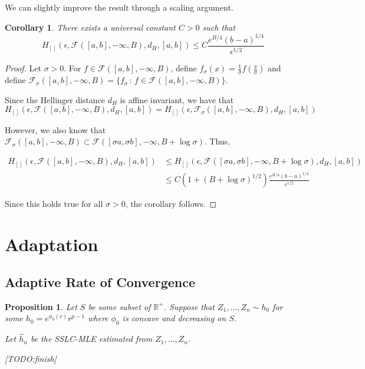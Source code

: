 \documentclass[12pt]{article}
\newtheorem{proposition}[theorem]{Proposition}
\newtheorem{corollary}[theorem]{Corollary}
\begin{document}
We can slightly improve the result through a scaling argument.

\begin{corollary}
  \label{Cor:SegmentBracket}
There exists a universal constant $C > 0$ such that 
\[
H_{[]}( \epsilon, \mathcal{F}([a,b],-\infty, B), d_H, [a,b]) \leq C \frac{ e^{B/4} (b-a)^{1/4}}{\epsilon^{1/2}} 
\]
\end{corollary}

\begin{proof}

Let $\sigma > 0$. For $f \in \mathcal{F}([a,b], -\infty, B)$, define $f_{\sigma}(x) = \frac{1}{\sigma} f( \frac{x}{\sigma})$ and define $\mathcal{F}_\sigma([a,b], - \infty, B) = \{ f_{\sigma} \,:\, f \in \mathcal{F}([a,b], - \infty, B) \}$. 

Since the Hellinger distance $d_H$ is affine invariant, we have that 
\[
H_{[]}( \epsilon, \mathcal{F}([a,b],-\infty, B), d_H, [a,b]) = H_{[]}( \epsilon, \mathcal{F}_\sigma([a,b],-\infty, B), d_H, [a,b])
\]

However, we also know that  $\mathcal{F}_\sigma([a,b],-\infty, B) \subset \mathcal{F}([\sigma a, \sigma b], -\infty, B + \log \sigma)$. Thus,

\begin{align*}
H_{[]}( \epsilon, \mathcal{F}([a,b],-\infty, B), d_H, [a,b]) &\leq H_{[]}( \epsilon, \mathcal{F}([\sigma a, \sigma b],-\infty, B + \log \sigma), d_H, [a,b])\\
  &\leq C( 1 + (B + \log \sigma)^{1/2}) \frac{ e^{B/4} (b-a)^{1/4}}{\epsilon^{1/2}} 
\end{align*}

Since this holds true for all $\sigma  > 0$, the corollary follows. 

\end{proof}

\newpage
\section{Adaptation}

\subsection{Adaptive Rate of Convergence}


\begin{proposition}
  Let $S$ be some subset of $\mathbb{R}^+$. 
  Suppose that $Z_1,...,Z_n \sim h_0$ for some $h_0 = e^{\phi_0(r)} r^{p-1}$ where $\phi_0$ is concave and decreasing on $S$.

  Let $\hat{h}_n$ be the SSLC-MLE estimated from $Z_1,...,Z_n$.

  [TODO:finish]
  
\end{proposition}
  
\end{document}
